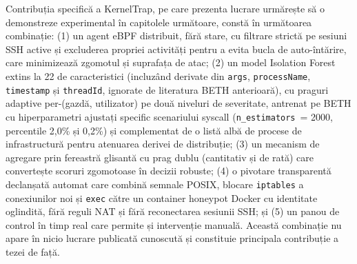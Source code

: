 Contribuția specifică a KernelTrap, pe care prezenta lucrare urmărește să o
demonstreze experimental în capitolele următoare, constă în următoarea
combinație: (1) un agent eBPF distribuit, fără stare, cu filtrare strictă pe
sesiuni SSH active și excluderea propriei activități pentru a evita bucla de
auto-întărire, care minimizează zgomotul și suprafața de atac; (2) un model
Isolation Forest extins la 22 de caracteristici (incluzând derivate din
\texttt{args}, \texttt{processName}, \texttt{timestamp} și \texttt{threadId},
ignorate de literatura BETH anterioară), cu praguri adaptive per-(gazdă,
utilizator) pe două niveluri de severitate, antrenat pe BETH cu hiperparametri
ajustați specific scenariului syscall (\texttt{n\_estimators}~= 2000, percentile
2,0\% și 0,2\%) și complementat de o listă albă de procese de infrastructură
pentru atenuarea derivei de distribuție; (3) un mecanism de agregare prin
fereastră glisantă cu prag dublu (cantitativ și de rată) care convertește scoruri
zgomotoase în decizii robuste; (4) o pivotare transparentă declanșată automat
care combină semnale POSIX, blocare \texttt{iptables} a conexiunilor noi și
\texttt{exec} către un container honeypot Docker cu identitate oglindită,
fără reguli NAT și fără reconectarea sesiunii SSH; și (5) un panou de control
în timp real care permite și intervenție manuală.
Această combinație nu apare în nicio lucrare publicată cunoscută și constituie
principala contribuție a tezei de față.
